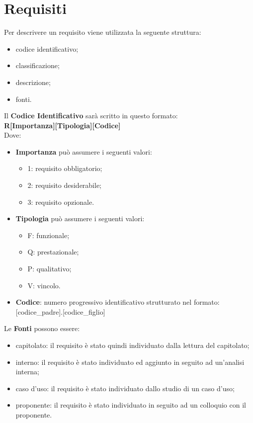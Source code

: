 \section{Requisiti}
Per descrivere un requisito viene utilizzata la seguente struttura:
\begin{itemize}
	\item codice identificativo;
	\item classificazione;
	\item descrizione;
	\item fonti.
\end{itemize} 
Il \textbf{Codice Identificativo} sarà scritto in questo formato: \\
\textbf{R[Importanza][Tipologia][Codice]} \\
Dove:
\begin{itemize}
	\item \textbf{Importanza} può assumere i seguenti valori:
	\begin{itemize}
		\item 1: requisito obbligatorio;
		\item 2: requisito desiderabile;
		\item 3: requisito opzionale.
	\end{itemize}
	\item \textbf{Tipologia} può assumere i seguenti valori:
	\begin{itemize}
		\item F: funzionale;
		\item Q: prestazionale;
		\item P: qualitativo;
		\item V: vincolo.
	\end{itemize}
	\item\textbf{Codice}: numero progressivo identificativo strutturato nel formato: [codice\_padre].[codice\_figlio]
\end{itemize}
Le \textbf{Fonti} possono essere:
\begin{itemize}
	\item capitolato\glo: il requisito è stato quindi individuato dalla lettura del capitolato\glo;
	\item interno: il requisito è stato individuato ed aggiunto in seguito ad un'analisi interna;
	\item caso d'uso\glo: il requisito è stato individuato dallo studio di un caso d'uso\glo;
	\item proponente: il requisito è stato individuato in seguito ad un colloquio con il proponente.
\end{itemize}
